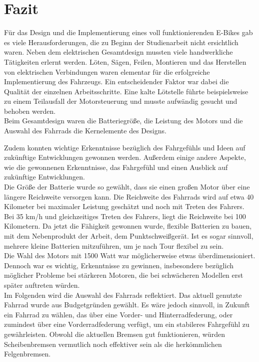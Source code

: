  \chapter{Fazit}

Für das Design und die Implementierung eines voll funktionierenden E-Bikes gab es viele Herausforderungen, die zu Beginn der Studienarbeit nicht ersichtlich waren.
Neben dem elektrischen Gesamtdesign mussten viele handwerkliche Tätigkeiten erlernt werden.
Löten, Sägen, Feilen, Montieren und das Herstellen von elektrischen Verbindungen waren elementar für die erfolgreiche Implementierung des Fahrzeugs.
Ein entscheidender Faktor war dabei die Qualität der einzelnen Arbeitsschritte.
Eine kalte Lötstelle führte beispielsweise zu einem Teilausfall der Motorsteuerung und musste aufwändig gesucht und behoben werden.\\

Beim Gesamtdesign waren die Batteriegröße, die Leistung des Motors und die Auswahl des Fahrrads die Kernelemente des Designs.

Zudem konnten wichtige Erkenntnisse bezüglich des Fahrgefühls und Ideen auf zukünftige Entwicklungen gewonnen werden.
Außerdem einige andere Aspekte, wie die gewonnenen Erkenntnisse, das Fahrgefühl und einen Ausblick auf zukünftige Entwicklungen.\\


Die Größe der Batterie wurde so gewählt, dass sie einen großen Motor über eine längere Reichweite versorgen kann.
Die Reichweite des Fahrrads wird auf etwa 40 Kilometer bei maximaler Leistung geschätzt und noch mit Treten des Fahrers.
Bei 35 km/h und gleichzeitiges Treten des Fahrers, liegt die Reichweite bei 100 Kilometern.
Da jetzt die Fähigkeit gewonnen wurde, flexible Batterien zu bauen, mit dem Nebenprodukt der Arbeit, dem Punktschweißgerät.
Ist es sogar sinnvoll, mehrere kleine Batterien mitzuführen, um je nach Tour flexibel zu sein.\\



Die Wahl des Motors mit 1500 Watt war möglicherweise etwas überdimensioniert.
Dennoch war es wichtig, Erkenntnisse zu gewinnen, insbesondere bezüglich möglicher Probleme bei stärkeren Motoren, die bei schwächeren Modellen erst später auftreten würden.\\


Im Folgenden wird die Auswahl des Fahrrads reflektiert.
Das aktuell genutzte Fahrrad wurde aus Budgetgründen gewählt.
Es wäre jedoch sinnvoll, in Zukunft ein Fahrrad zu wählen, das über eine Vorder- und Hinterradfederung, oder zumindest über eine Vorderradfederung verfügt, um ein stabileres Fahrgefühl zu gewährleisten.
Obwohl die aktuellen Bremsen gut funktionieren, würden Scheibenbremsen vermutlich noch effektiver sein als die herkömmlichen Felgenbremsen.\\


